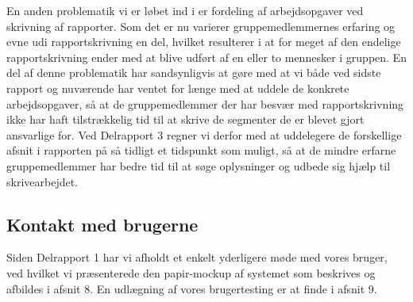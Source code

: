 \documentclass[10pt,a4paper,danish]{article}
\begin{document}
\newline
\newline
En anden problematik vi er løbet ind i er fordeling af arbejdsopgaver ved skrivning af rapporter. Som det er nu varierer gruppemedlemmernes erfaring og evne udi rapportskrivning en del, hvilket resulterer i at for meget af den endelige rapportskrivning ender med at blive udført af en eller to mennesker i gruppen. En del af denne problematik har sandsynligvis at gøre med at vi både ved sidste rapport og nuværende har ventet for længe med at uddele de konkrete arbejdsopgaver, så at de gruppemedlemmer der har besvær med rapportskrivning ikke har haft tilstrækkelig tid til at skrive de segmenter de er blevet gjort ansvarlige for. Ved Delrapport 3 regner vi derfor med at uddelegere de forskellige afsnit i rapporten på så tidligt et tidspunkt som muligt, så at de mindre erfarne gruppemedlemmer har bedre tid til at søge oplysninger og udbede sig hjælp til skrivearbejdet. 

\subsection{Kontakt med brugerne}
Siden Delrapport 1 har vi afholdt et enkelt yderligere møde med vores bruger, ved hvilket vi præsenterede den papir-mockup af systemet som beskrives og afbildes i afsnit 8. En udlægning af vores brugertesting er at finde i afsnit 9. 
\end{document}
